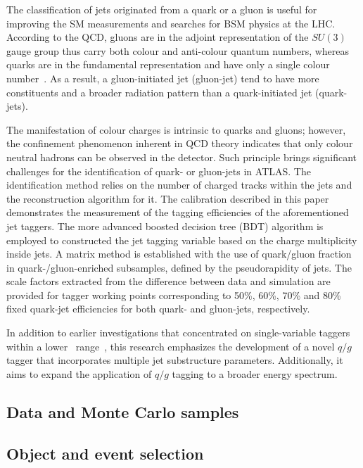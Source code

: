 The classification of jets originated from a quark or a gluon is useful for improving the SM measurements and searches for BSM physics at the LHC.  According to the QCD,  gluons are in the adjoint representation of the $SU(3)$ gauge group thus carry both colour and anti-colour quantum numbers, whereas quarks are in the fundamental representation and have only a single colour number~\cite{ALTARELLI1977298}. As a result, a gluon-initiated jet (gluon-jet) tend to have more constituents and a broader radiation pattern than a quark-initiated jet (quark-jets). 

The manifestation of colour charges is intrinsic to quarks and gluons; however, the confinement phenomenon inherent in QCD theory indicates that only colour neutral hadrons can be observed in the detector. Such principle brings significant challenges for the identification of quark- or gluon-jets in ATLAS. The identification method relies on the number of charged tracks within the jets and the reconstruction algorithm for it. The calibration described in this paper demonstrates the measurement of the tagging efficiencies of the aforementioned jet taggers. The more advanced boosted decision tree (BDT) algorithm is employed to constructed the jet tagging variable based on the charge multiplicity inside jets. A matrix method is established with the use of quark/gluon fraction in quark-/gluon-enriched subsamples, defined by the pseudorapidity of jets. The scale factors extracted from the difference between data and simulation are provided for tagger working points corresponding to 50\%, 60\%, 70\% and 80\% fixed quark-jet efficiencies for both quark- and gluon-jets, respectively.
  

In addition to earlier investigations that concentrated on single-variable taggers within a lower \pt~range~\cite{Aad_2014,ATL-PHYS-PUB-2017-009}, this research emphasizes the development of a novel $q/g$ tagger that incorporates multiple jet substructure parameters. Additionally, it aims to expand the application of $q/g$ tagging to a broader energy spectrum.

\subsection{Data and Monte Carlo samples}
\label{sec:Data-MC}


\subsection{Object and event selection}
\label{sec:Obj-event}



